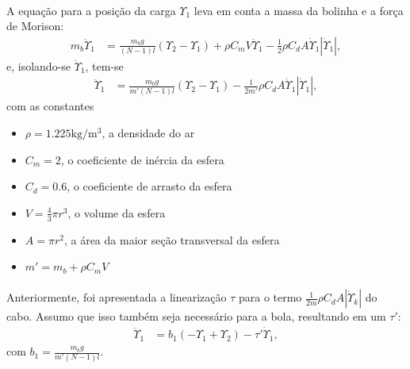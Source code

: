 \documentclass[a4paper,11pt]{scrartcl} %
\numberwithin{equation}{section} %
\numberwithin{figure}{section} %
\numberwithin{table}{section} %
\begin{document}
 \paragraph{} A equação para a posição da carga $\Upsilon_1$ leva em conta a massa da bolinha e a força de Morison: \begin{align}
 	m_b \ddot{\Upsilon}_1 &= \frac{m_b g}{(N-1)l}\left(\Upsilon_2 - \Upsilon_1\right) + \rho C_m V \ddot{\Upsilon}_1 - \frac{1}{2}\rho C_d A \dot{\Upsilon}_1 \left|\dot{\Upsilon}_1\right|,
 \end{align} e, isolando-se $\ddot{\Upsilon}_1$, tem-se \begin{align}
 	\ddot{\Upsilon}_1 &= \frac{m_b g}{m'(N-1)l}\left(\Upsilon_2 - \Upsilon_1\right)  - \frac{1}{2m'}\rho C_d A \dot{\Upsilon}_1 \left|\dot{\Upsilon}_1\right|,
 \end{align} com as constantes \begin{itemize}
 	\item $\rho = 1.225\mathrm{kg}/\mathrm{m}^3$, a densidade do ar
 	\item $C_m = 2$, o coeficiente de inércia da esfera
 	\item $C_d = 0.6$, o coeficiente de arrasto da esfera
 	\item $V = \frac{4}{3}\pi r^3$, o volume da esfera
 	\item $A = \pi r^2$, a área da maior seção transversal da esfera
 	\item $m' = m_b + \rho C_m V$
 \end{itemize}
 
 \paragraph{} Anteriormente, foi apresentada a linearização $\tau$ para o termo $\frac{1}{2m}\rho C_d A\left|\dot{\Upsilon}_k\right|$ do cabo. Assumo que isso também seja necessário para a bola, resultando em um $\tau'$: \begin{align}
 	\ddot{\Upsilon}_1 &= b_1\left(-\Upsilon_1 + \Upsilon_2\right) - \tau'\dot{\Upsilon}_1,
 \end{align} com $b_1 = \frac{m_b g}{m' (N-1)l}$.
 
\end{document}
